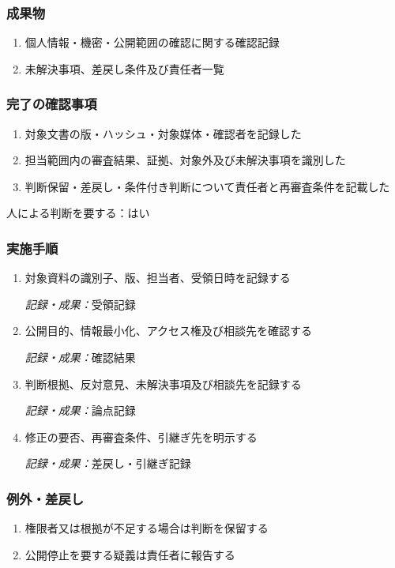 \documentclass[a4paper,11pt]{article}
\begin{document}
\subsubsection*{成果物}
\begin{enumerate}[leftmargin=2em,itemsep=0.35em]
\item 個人情報・機密・公開範囲の確認に関する確認記録
\item 未解決事項、差戻し条件及び責任者一覧
\end{enumerate}
\subsubsection*{完了の確認事項}
\begin{enumerate}[leftmargin=2em,itemsep=0.35em]
\item 対象文書の版・ハッシュ・対象媒体・確認者を記録した
\item 担当範囲内の審査結果、証拠、対象外及び未解決事項を識別した
\item 判断保留・差戻し・条件付き判断について責任者と再審査条件を記載した
\end{enumerate}
\par 人による判断を要する：はい\par\medskip
\subsubsection*{実施手順}
\begin{enumerate}[leftmargin=2em,itemsep=0.65em]
\item 対象資料の識別子、版、担当者、受領日時を記録する\par\noindent\textit{記録・成果：}受領記録\nobreak\smallskip
\item 公開目的、情報最小化、アクセス権及び相談先を確認する\par\noindent\textit{記録・成果：}確認結果\nobreak\smallskip
\item 判断根拠、反対意見、未解決事項及び相談先を記録する\par\noindent\textit{記録・成果：}論点記録\nobreak\smallskip
\item 修正の要否、再審査条件、引継ぎ先を明示する\par\noindent\textit{記録・成果：}差戻し・引継ぎ記録\nobreak\smallskip
\end{enumerate}
\subsubsection*{例外・差戻し}
\begin{enumerate}[leftmargin=2em,itemsep=0.35em]
\item 権限者又は根拠が不足する場合は判断を保留する
\item 公開停止を要する疑義は責任者に報告する
\end{enumerate}
\end{document}
